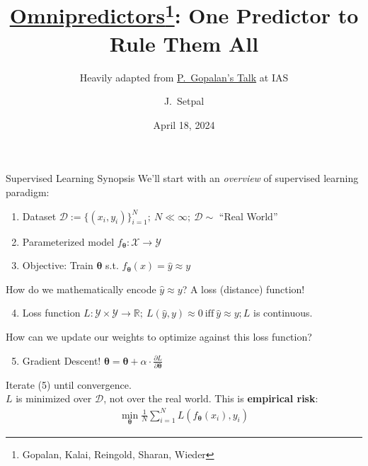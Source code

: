 \documentclass{beamer}
\title[Omnipredictors]{\href{https://arxiv.org/abs/2109.05389}{Omnipredictors}\thanks{Gopalan, Kalai, Reingold, Sharan, Wieder}: One Predictor to Rule Them All}
\subtitle{Heavily adapted from \href{https://youtu.be/DCPRdL03-dk}{P.~Gopalan's Talk} at IAS}
\author[Machine Learning @ Purdue] %
{J.~Setpal}
\date{April 18, 2024}
\begin{document}
\frame{\titlepage}



\begin{frame}{Supervised Learning Synopsis}
	We'll start with an \textit{overview} of supervised learning paradigm:
	\begin{enumerate}[label=\arabic*.]
		\item Dataset $\mathcal{D} := \{(x_i, y_i)\}^N_{i=1};~N \ll \infty;~\mathcal{D} \sim $ ``Real World'' \pause
		\item Parameterized model $f_{\bm{\theta}} : \mathcal{X} \rightarrow \mathcal{Y}$ \pause
		\item Objective: Train $\bm{\theta}$ s.t. $f_{\bm{\theta}}(x) = \hat{y} \approx y$ \pause
	\end{enumerate}
	How do we mathematically encode $\hat{y} \approx y$? \pause A loss (distance) function!
	\begin{enumerate}[label=\arabic*.]
			\setcounter{enumi}{3}
		\item Loss function $L : \mathcal{Y} \times \mathcal{Y} \rightarrow \mathbb{R};~L(\hat{y}, y) \approx 0~\text{iff}~\hat{y} \approx y; L$ is continuous. \pause
	\end{enumerate}
	How can we update our weights to optimize against this loss function? \pause
	\begin{enumerate}[label=\arabic*.]
			\setcounter{enumi}{4}
		\item Gradient Descent! $\bm{\theta} = \bm{\theta} + \alpha \cdot \frac{\partial L}{\partial \bm{\theta}}$
	\end{enumerate}
	Iterate (5) until convergence. \pause \newline \\
	$L$ is minimized over $\mathcal{D}$, not over the real world. \pause This is \textbf{empirical risk}:
	\begin{gather}
		\min_{\bm{\theta}} \frac{1}{N}\sum^N_{i=1} L(f_{\bm{\theta}}(x_i), y_i)
	\end{gather}
\end{frame}
\end{document}
